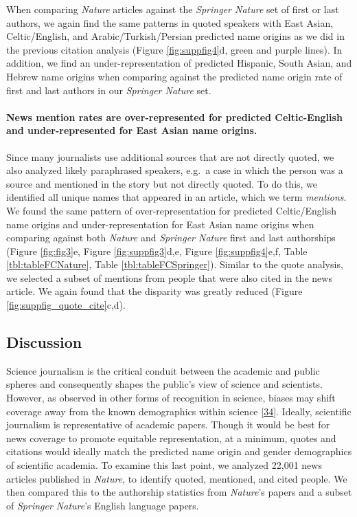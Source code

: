 When comparing \emph{Nature} articles against the \emph{Springer Nature} set of first or last authors, we again find the same patterns in quoted speakers with East Asian, Celtic/English, and Arabic/Turkish/Persian predicted name origins as we did in the previous citation analysis (Figure \ref{fig:suppfig4}d, green and purple lines).
In addition, we find an under-representation of predicted Hispanic, South Asian, and Hebrew name origins when comparing against the predicted name origin rate of first and last authors in our \emph{Springer Nature} set.

\hypertarget{news-mention-rates-are-over-represented-for-predicted-celtic-english-and-under-represented-for-east-asian-name-origins.}{%
\paragraph{News mention rates are over-represented for predicted Celtic-English and under-represented for East Asian name origins.}\label{news-mention-rates-are-over-represented-for-predicted-celtic-english-and-under-represented-for-east-asian-name-origins.}}

Since many journalists use additional sources that are not directly quoted, we also analyzed likely paraphrased speakers, e.g.~a case in which the person was a source and mentioned in the story but not directly quoted.
To do this, we identified all unique names that appeared in an article, which we term \emph{mentions}.
We found the same pattern of over-representation for predicted Celtic/English name origins and under-representation for East Asian name origins when comparing against both \emph{Nature} and \emph{Springer Nature} first and last authorships (Figure \ref{fig:fig3}e, Figure \ref{fig:suppfig3}d,e, Figure \ref{fig:suppfig4}e,f, Table \ref{tbl:tableFCNature}, Table \ref{tbl:tableFCSpringer}).
Similar to the quote analysis, we selected a subset of mentions from people that were also cited in the news article.
We again found that the disparity was greatly reduced (Figure \ref{fig:suppfig_quote_cite}c,d).

\hypertarget{discussion}{%
\subsection{Discussion}\label{discussion}}

Science journalism is the critical conduit between the academic and public spheres and consequently shapes the public's view of science and scientists.
However, as observed in other forms of recognition in science, biases may shift coverage away from the known demographics within science {[}\protect\hyperlink{ref-GCXcas65}{34}{]}.
Ideally, scientific journalism is representative of academic papers.
Though it would be best for news coverage to promote equitable representation, at a minimum, quotes and citations would ideally match the predicted name origin and gender demographics of scientific academia.
To examine this last point, we analyzed 22,001 news articles published in \emph{Nature}, to identify quoted, mentioned, and cited people.
We then compared this to the authorship statistics from \emph{Nature}'s papers and a subset of \emph{Springer Nature}'s English language papers.

